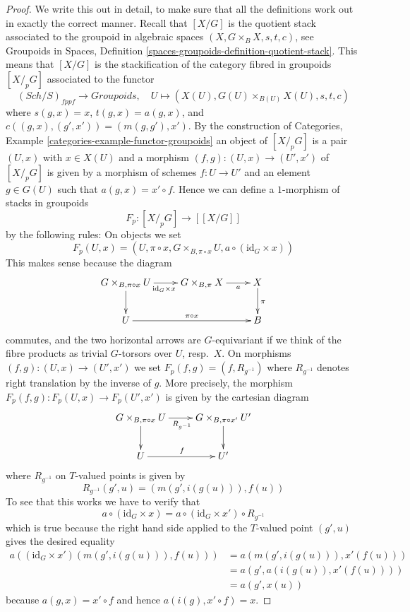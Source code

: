 \documentclass[10pt,a4paper]{amsart}
\theoremstyle{plain}
\theoremstyle{definition}
\theoremstyle{remark}
\numberwithin{equation}{subsection}
\def\Sch{\mathit{Sch}}
\begin{document}
\begin{proof}
We write this out in detail, to make sure that all the definitions
work out in exactly the correct manner.
Recall that $[X/G]$ is the quotient stack
associated to the groupoid in algebraic spaces
$(X, G \times_B X, s, t, c)$, see
Groupoids in Spaces,
Definition \ref{spaces-groupoids-definition-quotient-stack}.
This means that $[X/G]$ is the stackification of the
category fibred in groupoids $[X/_{\!p}G]$ associated to the functor
$$
(\Sch/S)_{fppf} \longrightarrow \textit{Groupoids},
\quad
U \longmapsto (X(U), G(U) \times_{B(U)} X(U), s, t, c)
$$
where $s(g, x) = x$, $t(g, x) = a(g, x)$, and
$c((g, x), (g', x')) = (m(g, g'), x')$. By the construction of
Categories, Example \ref{categories-example-functor-groupoids}
an object of $[X/_{\!p}G]$ is a pair $(U, x)$ with $x \in X(U)$
and a morphism $(f, g) : (U, x) \to (U', x')$ of $[X/_{\!p}G]$
is given by a morphism of schemes $f : U \to U'$ and an element
$g \in G(U)$ such that $a(g, x) = x' \circ f$.
Hence we can define a $1$-morphism of stacks in groupoids
$$
F_p : [X/_{\!p}G] \longrightarrow [[X/G]]
$$
by the following rules: On objects we set
$$
F_p(U, x) =
(U, \pi \circ x, G \times_{B, \pi \circ x} U, a \circ (\text{id}_G \times x))
$$
This makes sense because the diagram
$$
\xymatrix{
G \times_{B, \pi \circ x} U \ar[d] \ar[r]_{\text{id}_G \times x} &
G \times_{B, \pi} X \ar[r]_-a &
X \ar[d]^\pi \\
U \ar[rr]^{\pi \circ x} & & B
}
$$
commutes, and the two horizontal arrows are $G$-equivariant if we think
of the fibre products as trivial $G$-torsors over $U$, resp.\ $X$.
On morphisms $(f, g) : (U, x) \to (U', x')$ we set
$F_p(f, g) = (f, R_{g^{-1}})$ where $R_{g^{-1}}$ denotes right translation
by the inverse of $g$. More precisely, the morphism
$F_p(f, g) : F_p(U, x) \to F_p(U', x')$ is given by the cartesian diagram
$$
\xymatrix{
G \times_{B, \pi \circ x} U \ar[d] \ar[r]_{R_{g^{-1}}} &
G \times_{B, \pi \circ x'} U' \ar[d] \\
U \ar[r]^f & U'
}
$$
where $R_{g^{-1}}$ on $T$-valued points is given by
$$
R_{g^{-1}}(g', u) = (m(g', i(g(u))), f(u))
$$
To see that this works we have to verify that
$$
a \circ (\text{id}_G \times x)
=
a \circ (\text{id}_G \times x') \circ R_{g^{-1}}
$$
which is true because the right hand side applied to the $T$-valued point
$(g', u)$ gives the desired equality
\begin{align*}
a((\text{id}_G \times x')(m(g', i(g(u))), f(u)))
& =
a(m(g', i(g(u))), x'(f(u))) \\
& =
a(g', a(i(g(u)), x'(f(u)))) \\
& =
a(g', x(u))
\end{align*}
because $a(g, x) = x' \circ f$ and hence $a(i(g), x' \circ f) = x$.


\end{proof}
\end{document}
